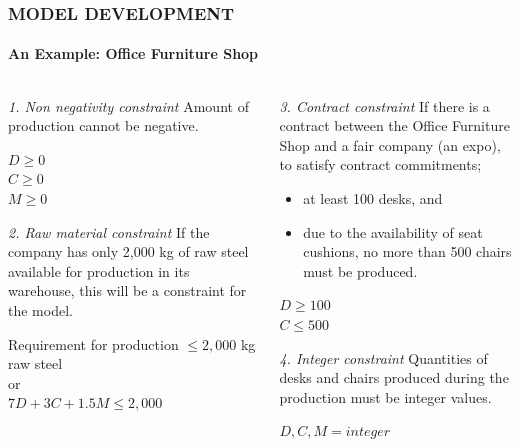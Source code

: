 \documentclass[14 pt]{beamer}
\begin{document}
\begin{frame}[t]
\frametitle{MODEL DEVELOPMENT}
\framesubtitle{An Example: Office Furniture Shop}

\begin{columns}[t]
\begin{column}{0.45\textwidth}
\emph{1. Non negativity constraint}
\vskip0.5cm%
Amount of production cannot be negative.
\vskip0.5cm%
\begin{center}
  $D \geq 0$ \\
  $C \geq 0$ \\
  $M \geq 0$
\end{center}

\emph{2. Raw material constraint}
\vskip0.5cm%
If the company has only 2,000 kg of raw steel available for production in its warehouse, this will be a constraint for the model.
\vskip0.5cm%
\begin{center}
  Requirement for production $\leq 2,000$ kg raw steel\\
  or\\
  $7D + 3C + 1.5M \leq 2,000$
\end{center}
\end{column}

\begin{column}{0.45\textwidth}
\emph{3. Contract constraint}
\vskip0.5cm%
If there is a contract between the Office Furniture Shop and a fair company (an expo), to satisfy contract commitments;

\begin{itemize}
  \item at least 100 desks, and
  \item due to the availability of seat cushions, no more than 500 chairs must be produced.
\end{itemize}

\begin{center}
  $D \geq 100$ \\
  $C \leq 500$
\end{center}

\emph{4. Integer constraint}
\vskip0.5cm%
Quantities of desks and chairs produced during the production must be integer values.
\begin{center}
  $D, C, M = integer$
\end{center}
\end{column}
\end{columns}
\end{frame}

\end{document}
